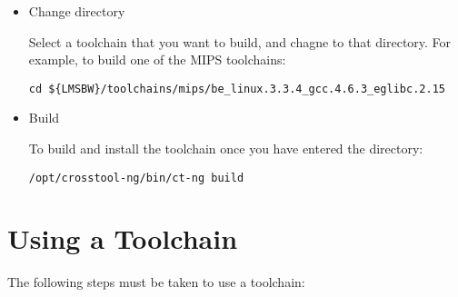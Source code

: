 \begin{itemize}
  \item Change directory

    Select a toolchain that you want to build, and chagne to that
    directory.  For example, to build one of the MIPS toolchains:

\begin{footnotesize}
\begin{verbatim}
cd ${LMSBW}/toolchains/mips/be_linux.3.3.4_gcc.4.6.3_eglibc.2.15
\end{verbatim}
\end{footnotesize}

  \item Build

    To build and install the toolchain once you have entered the
    directory:

    \texttt{/opt/crosstool-ng/bin/ct-ng build}
\end{itemize}


\section{Using a Toolchain}

The following steps must be taken to use a toolchain:

